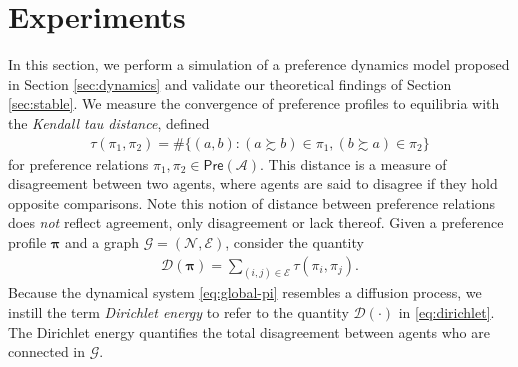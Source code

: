 \documentclass[conference]{ieeeconf}
\newcommand{\N}{\mathcal{N}}
\newcommand{\A}{\mathcal{A}}
\newcommand{\G}{\mathcal{G}}
\newcommand{\E}{\mathcal{E}}
\newcommand{\D}{\mathcal{D}}
\newcommand{\Pref}{\mathsf{Pre}}
\newcommand{\prefers}{\succsim}
\newcommand{\profile}{\boldsymbol{\pi}}
\begin{document}
\section{Experiments}
\label{sec:experiments}

In this section, we perform a simulation of a preference dynamics model proposed in Section \ref{sec:dynamics} and validate our theoretical findings of Section \ref{sec:stable}. We measure the convergence of preference profiles to equilibria with the \emph{Kendall tau distance}, defined
\begin{align}
        \tau(\pi_1,\pi_2) =  \#\{ (a,b) : (a \prefers b) \in \pi_1, (b \prefers a) \in \pi_2  \} \label{eq:kendall}
    \end{align}
for preference relations $\pi_1, \pi_2 \in \Pref(\A)$. This distance is a measure of disagreement between two agents, where agents are said to disagree if they hold opposite comparisons. Note this notion of distance between preference relations does \emph{not} reflect agreement, only disagreement or lack thereof. Given a preference profile $\profile$ and a graph $\G = (\N,\E)$, consider the quantity
\begin{align}
    \D(\profile) = \sum_{(i,j) \in \E} \tau(\pi_i,\pi_j). \label{eq:dirichlet}
\end{align}
Because the dynamical system \eqref{eq:global-pi} resembles a diffusion process, we instill the term \emph{Dirichlet energy} to refer to the quantity $\D(\cdot)$ in \eqref{eq:dirichlet}. The Dirichlet energy quantifies the total disagreement between agents who are connected in $\G$. 
\end{document}
